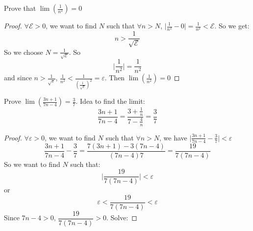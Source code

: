 \documentclass{report}
\begin{document}
\begin{examples}
    \begin{example}
        Prove that $\lim (\frac{1}{n^{2}}) = 0$
            \begin{proof}
                $\forall \mathcal{E} > 0$, we want to find $N$ such that $\forall n > N$, $\lvert \frac{1}{n^{2}} - 0 \rvert = \frac{1}{n^{2}} <  \mathcal{E}$. So we get:
                    \begin{equation*}
                        n >  \frac{1}{\sqrt{\mathcal{E}}}
                    \end{equation*}
                So we choose $N = \frac{1}{\sqrt{\mathcal{E}}}$. So 
                    \begin{equation*}
                        \lvert \frac{1}{n^{2}} \rvert = \frac{1}{n^{2}}
                    \end{equation*}
                and since $n >  \frac{1}{\sqrt{\varepsilon}}$, $\frac{1}{n^{2}} <  \frac{1}{(\frac{1}{\sqrt{\varepsilon}})^{2}} = \varepsilon$. Then $\lim (\frac{1}{n^{2}}) = 0$
            \end{proof}
    \end{example}
    \begin{example}
        Prove $\lim (\frac{3n + 1}{7n - 4}) = \frac{3}{7}$. Idea to find the limit:
            \begin{equation*}
                \dfrac{3n + 1}{7n - 4} = \dfrac{3 + \frac{1}{n}}{7 - \frac{4}{n}} = \frac{3}{7}
            \end{equation*}
        \begin{proof}
            $\forall \varepsilon> 0$, we want to find $N$ such that $\forall n > N$, we have $\lvert \frac{3n + 1}{7n - 4} - \frac{3}{7} \rvert <  \varepsilon$
                \begin{equation*}
                    \dfrac{3n + 1}{7n - 4} - \frac{3}{7} = \dfrac{7(3n + 1) - 3(7n - 4)}{(7n - 4)7} = \dfrac{19}{7(7n - 4)}
                \end{equation*}
            So we want to find $N$ such that:
                \begin{equation*}
                    \lvert \dfrac{19}{7(7n - 4)} \rvert <  \varepsilon 
                \end{equation*}
            or
                \begin{equation*}
                    \varepsilon < \dfrac{19}{7(7n - 4)} <  \varepsilon 
                \end{equation*}
            Since $7n - 4 > 0$, $\dfrac{19}{7(7n - 4)} > 0$. Solve:

\end{proof}
\end{example}
\end{examples}
\end{document}
